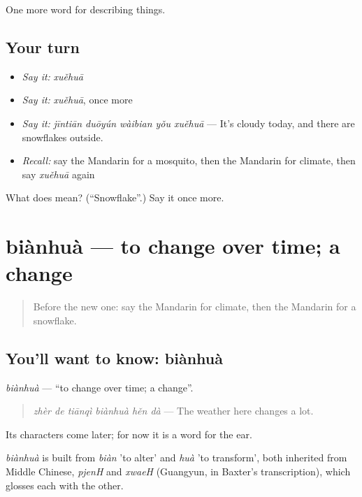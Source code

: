 \begin{grammarlens}[title={What you've built}]
One more word for describing things.
\end{grammarlens}

\subsection*{Your turn}
\begin{itemize}
\raggedright
  \item \emph{Say it:} \emph{xuěhuā}
  \item \emph{Say it:} \emph{xuěhuā}, once more
  \item \emph{Say it:} \emph{jīntiān duōyún wàibian yǒu xuěhuā} — It's cloudy today, and there are snowflakes outside.
  \item \emph{Recall:} say the Mandarin for a mosquito, then the Mandarin for climate, then say \emph{xuěhuā} again
\end{itemize}

\begin{tcolorbox}[breakable,colback=teal!4,colframe=teal!35!black,title={Before you move on}]
What does  mean? (\textquotedblleft{}Snowflake\textquotedblright{}.) Say it once more.
\end{tcolorbox}
\section[biànhuà]{biànhuà — to change over time; a change}

\label{lesson:ZH-C243-bianhua}



\begin{quote}
Before the new one: say the Mandarin for climate, then the Mandarin for a snowflake.
\end{quote}

\subsection*{You'll want to know: biànhuà}
\emph{biànhuà} — \textquotedblleft{}to change over time; a change\textquotedblright{}.

\begin{quote}
\emph{zhèr de tiānqì biànhuà hěn dà} — The weather here changes a lot.
\end{quote}

Its characters come later; for now it is a word for the ear.

\begin{cousinweb}
\emph{biànhuà} is built from \emph{biàn} 'to alter' and \emph{huà} 'to transform', both inherited from Middle Chinese, \emph{pjenH} and \emph{xwaeH} (Guangyun, in Baxter's transcription), which glosses each with the other.
\end{cousinweb}

